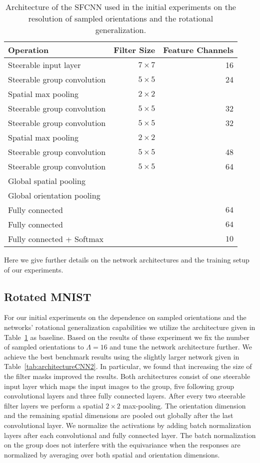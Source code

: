 \documentclass[10pt,twocolumn,letterpaper]{article}
\begin{document}
\begin{table}[t]
	\centering
	\small
	\begin{tabular}{lrr}
		\toprule
		Operation & Filter Size & Feature Channels \\
		\toprule
		Steerable input layer  & $7\times 7$ &  16 \\
		Steerable group convolution  & $5\times 5$ &  24 \\
		Spatial max pooling & $2 \times 2$ & \\
		\midrule
		Steerable group convolution  & $5\times 5$ &  32 \\
		Steerable group convolution  & $5\times 5$ &  32 \\
		Spatial max pooling & $2 \times 2$ & \\
		\midrule
		Steerable group convolution  & $5\times 5$ &  48 \\
		Steerable group convolution  & $5\times 5$ &  64 \\
		Global spatial pooling \\
		Global orientation pooling \\
		\midrule
		Fully connected  & & $64$ \\
		Fully connected  & & $64$ \\
		Fully connected + Softmax  & & $10$ \\
		\bottomrule
	\end{tabular}
	\caption{Architecture of the SFCNN used in the initial experiments on the resolution of sampled orientations and the rotational generalization.}
	\label{tab:architectureCNN1}
\end{table}


Here we give further details on the network architectures and the training setup of our experiments.

\subsection{Rotated MNIST}

For our initial experiments on the dependence on sampled orientations and the networks' rotational generalization capabilities we utilize the architecture given in Table~\ref{tab:architectureCNN1} as baseline.
Based on the results of these experiment we fix the number of sampled orientations to $\Lambda=16$ and tune the network architecture further.
We achieve the best benchmark results using the slightly larger network given in Table~\ref{tab:architectureCNN2}.
In particular, we found that increasing the size of the filter masks improved the results.
Both architectures consist of one steerable input layer which maps the input images to the group, five following group convolutional layers and three fully connected layers.
After every two steerable filter layers we perform a spatial $2\times2$ max-pooling.
The orientation dimension and the remaining spatial dimensions are pooled out globally after the last convolutional layer.
We normalize the activations by adding batch normalization layers \citep{ioffe2015batch} after each convolutional and fully connected layer.
The batch normalization on the group does not interfere with the equivariance when the responses are normalized by averaging over both spatial and orientation dimensions.
\end{document}
